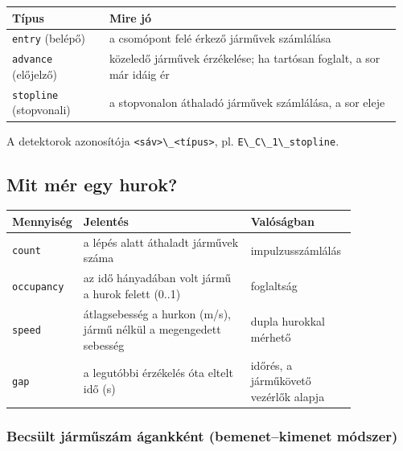 \begin{longtable}[]{@{}>{\raggedright\arraybackslash}p{0.24\linewidth}>{\raggedright\arraybackslash}p{0.72\linewidth}@{}}
\toprule\noalign{}
Típus & Mire jó \\
\midrule\noalign{}
\endhead
\bottomrule\noalign{}
\endlastfoot
\passthrough{\lstinline!entry!} (belépő)
& a csomópont felé érkező járművek
számlálása \\
\passthrough{\lstinline!advance!}
(előjelző) & közeledő járművek
érzékelése; ha tartósan foglalt, a sor
már idáig ér \\
\passthrough{\lstinline!stopline!}
(stopvonali) & a stopvonalon áthaladó
járművek számlálása, a sor eleje \\
\end{longtable}

A detektorok azonosítója
\passthrough{\lstinline!<sáv>\_<típus>!},
pl.
\passthrough{\lstinline!E\_C\_1\_stopline!}.

\hypertarget{mit-muxe9r-egy-hurok}{%
\subsection{Mit mér egy
hurok?}\label{mit-muxe9r-egy-hurok}}

\begin{longtable}[]{@{}l>{\raggedright\arraybackslash}p{0.54\linewidth}>{\raggedright\arraybackslash}p{0.31\linewidth}@{}}
\toprule\noalign{}
Mennyiség & Jelentés & Valóságban \\
\midrule\noalign{}
\endhead
\bottomrule\noalign{}
\endlastfoot
\passthrough{\lstinline!count!} & a
lépés alatt áthaladt járművek száma &
impulzusszámlálás \\
\passthrough{\lstinline!occupancy!} & az
idő hányadában volt jármű a hurok felett
(0..1) & foglaltság \\
\passthrough{\lstinline!speed!} &
átlagsebesség a hurkon (m/s), jármű
nélkül a megengedett sebesség & dupla
hurokkal mérhető \\
\passthrough{\lstinline!gap!} & a
legutóbbi érzékelés óta eltelt idő (s) &
időrés, a járműkövető vezérlők alapja \\
\end{longtable}

\hypertarget{becsuxfclt-juxe1rmux171szuxe1m-uxe1gankkuxe9nt-bemenetkimenet-muxf3dszer}{%
\subsubsection{Becsült járműszám
ágankként (bemenet--kimenet
módszer)}\label{becsuxfclt-juxe1rmux171szuxe1m-uxe1gankkuxe9nt-bemenetkimenet-muxf3dszer}}

